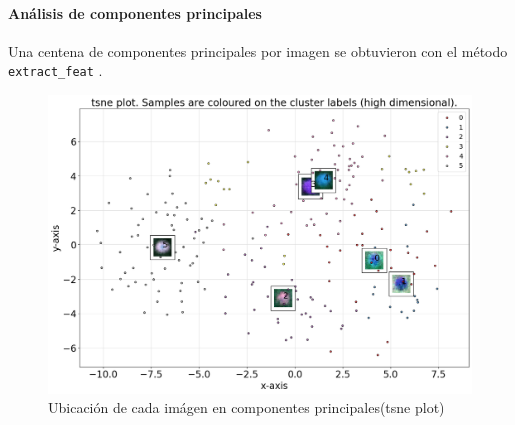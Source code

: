 \documentclass{article}
\begin{document}

\paragraph{Análisis de componentes principales}
Una centena de componentes principales por imagen se obtuvieron con el método \verb'extract_feat' \cite{taskesen_pca_2020}.





\begin{figure}
  \centering
  \includegraphics[width= 0.8\linewidth]{tsne}
  \caption{Ubicación de cada imágen en componentes principales(tsne plot)}
\end{figure}


\printbibliography[title= Referencias, heading=bibintoc]
\end{document}
